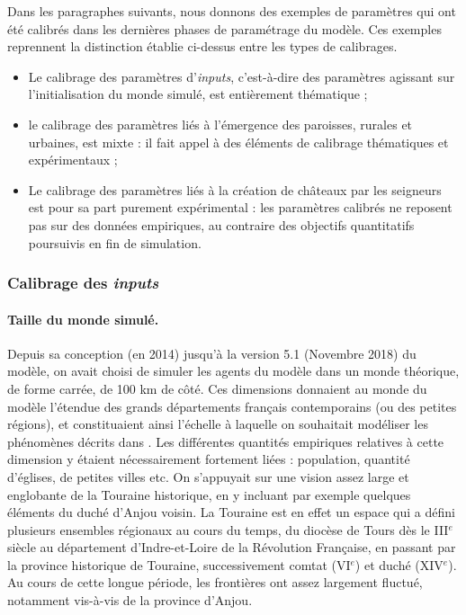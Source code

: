 Dans les paragraphes suivants, nous donnons des exemples de paramètres qui ont été calibrés dans les dernières phases de paramétrage du modèle.
Ces exemples reprennent la distinction établie ci-dessus entre les types de calibrages.
\begin{itemize}
	\item Le calibrage des paramètres d'\textit{inputs}, c'est-à-dire des paramètres agissant sur l'initialisation du monde simulé, est entièrement thématique ;
	\item le calibrage des paramètres liés à l'émergence des paroisses, rurales et urbaines, est mixte : il fait appel à des éléments de calibrage thématiques et expérimentaux ;
	\item Le calibrage des paramètres liés à la création de châteaux par les seigneurs est pour sa part purement expérimental : les paramètres calibrés ne reposent pas sur des données empiriques, au contraire des objectifs quantitatifs poursuivis en fin de simulation.
\end{itemize}


\subsubsection{Calibrage des \textit{inputs} \label{sssec:calibrage-inputs}}
\paragraph{Taille du monde simulé.}

Depuis sa conception (en 2014) jusqu'à la version 5.1 (Novembre 2018) du modèle, on avait choisi de simuler les agents du modèle dans un monde théorique, de forme carrée, de 100 km de côté.
Ces dimensions donnaient au monde du modèle l'étendue des grands départements français contemporains (ou des petites régions), et constituaient ainsi l'échelle à laquelle on souhaitait modéliser les phénomènes décrits dans \simfeodal{}.
Les différentes quantités empiriques relatives à cette dimension y étaient nécessairement fortement liées : population, quantité d'églises, de petites villes etc.
On s'appuyait sur une vision assez large et englobante de la Touraine historique, en y incluant par exemple quelques éléments du duché d'Anjou voisin.
La Touraine est en effet un espace qui a défini plusieurs ensembles régionaux au cours du temps, du diocèse de Tours dès le III$^e$ siècle au département d'Indre-et-Loire de la Révolution Française, en passant par la province historique de Touraine, successivement comtat (VI$^e$) et duché (XIV$^e$).
Au cours de cette longue période, les frontières ont assez largement fluctué, notamment vis-à-vis de la province d'Anjou.

